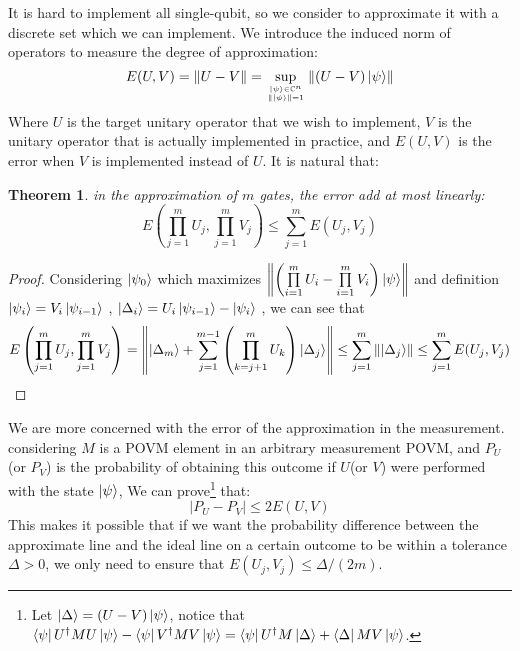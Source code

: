 \documentclass[a4paper,10pt]{article}
\newtheorem{theorem}{Theorem}[subsection]
\numberwithin{equation}{subsection}
\begin{document}
It is hard to implement all single-qubit, so we consider to approximate it with a discrete set which we can implement. We introduce the induced norm of operators to measure the degree of approximation:
\begin{equation}
    E(U,V) = \left\| U-V \right\| = \sup\limits_{\ket{\psi} \in \mathbb{C}^{n} \atop \left\| \ket{\psi} \right\| = 1} \left\| (U-V)\ket{\psi} \right\|
\end{equation}
Where $U$ is the target unitary operator
that we wish to implement, $V$ is the unitary operator that is actually implemented in practice, and $E(U,V)$ is the error when $V$ is implemented instead of $U$. It is natural that:
\begin{theorem}
    in the approximation of $m$ gates, the error add at most linearly:
    \begin{equation}
        E\left(\prod\limits_{j=1}^{m}U_{j},\prod\limits_{j=1}^{m}V_{j}\right) \leq \sum_{j=1}^{m} E(U_{j},V_{j})
    \end{equation}
\end{theorem}
\begin{proof}
    Considering $\ket{\psi_{0}}$ which maximizes $\left\|\left(\prod\limits_{i=1}^{m}U_{i} -  \prod\limits_{i=1}^{m}V_{i}\right)\ket{\psi}\right\|$ and definition $\ket{\psi_{i}} = V_{i}\ket{\psi_{i-1}}$ , $\ket{\Delta_{i}} = U_{i}\ket{\psi_{i-1}} - \ket{\psi_{i}}$ , we can see that
    \begin{equation}
        E\left(\prod\limits_{j=1}^{m}U_{j},\prod\limits_{j=1}^{m}V_{j}\right) = \left\|\ket{\Delta_{m}} + \sum\limits_{j=1}^{m-1} \left(\prod_{k=j+1}^{m}U_{k}\right)\ket{\Delta_{j}}\right\| \leq \sum\limits_{j=1}^{m} \left\|\ket{\Delta_{j}}\right\| \leq \sum_{j=1}^{m} E(U_{j},V_{j})
    \end{equation}
\end{proof}


We are more concerned with the error of the approximation in the measurement. considering $M$ is a POVM element in an arbitrary measurement POVM, and $P_{U}$(or $P_{V}$) is the probability of obtaining this outcome if $U$(or $V$) were performed with the state $\ket{\psi}$, We can prove\footnote{Let $\ket{\Delta} = (U-V)\ket{\psi}$, notice that $\bra{\psi}U^{\dagger}MU\ket{\psi} - \bra{\psi}V^{\dagger}MV\ket{\psi} = \bra{\psi}U^{\dagger}M\ket{\Delta} + \bra{\Delta}MV\ket{\psi}$. } that:
\begin{equation}
    \left| P_{U} - P_{V} \right| \leq 2E(U,V)
\end{equation}
This makes it possible that if we want the probability difference between the approximate line and the ideal line on a certain outcome to be within a tolerance $\Delta > 0$, we only need to ensure that $E(U_{j},V_{j}) \leq \Delta/(2m)$.
\end{document}
